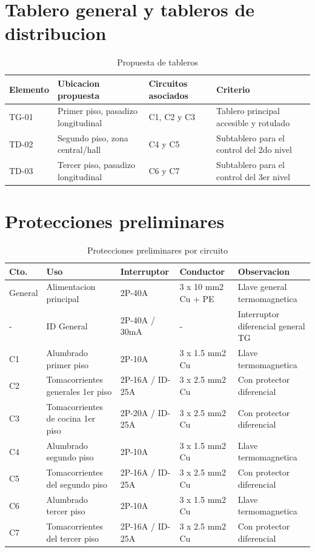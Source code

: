 \section{Tablero general y tableros de distribucion}

\begin{table}[H]
\centering
\small
\caption{Propuesta de tableros}
\label{tab:tableros-distribucion}
\begin{tabularx}{\textwidth}{L{1.8cm}L{4.0cm}L{4.2cm}Y}
\toprule
\textbf{Elemento} & \textbf{Ubicacion propuesta} & \textbf{Circuitos asociados} & \textbf{Criterio} \\
\midrule
TG-01 & Primer piso, pasadizo longitudinal & C1, C2 y C3 & Tablero principal accesible y rotulado \\
TD-02 & Segundo piso, zona central/hall & C4 y C5 & Subtablero para el control del 2do nivel \\
TD-03 & Tercer piso, pasadizo longitudinal & C6 y C7 & Subtablero para el control del 3er nivel \\
\bottomrule
\end{tabularx}
\end{table}

\section{Protecciones preliminares}

\begin{table}[H]
\centering
\small
\setlength{\tabcolsep}{3pt}
\caption{Protecciones preliminares por circuito}
\label{tab:protecciones-preliminares}
\begin{tabularx}{\textwidth}{l Y Y Y Y}
\toprule
\textbf{Cto.} & \textbf{Uso} & \textbf{Interruptor} & \textbf{Conductor} & \textbf{Observacion} \\
\midrule
General & Alimentacion principal & 2P-40A & 3 x 10 mm2 Cu + PE & Llave general termomagnetica \\
- & ID General & 2P-40A / 30mA & - & Interruptor diferencial general TG \\
C1 & Alumbrado primer piso & 2P-10A & 3 x 1.5 mm2 Cu & Llave termomagnetica \\
C2 & Tomacorrientes generales 1er piso & 2P-16A / ID-25A & 3 x 2.5 mm2 Cu & Con protector diferencial \\
C3 & Tomacorrientes de cocina 1er piso & 2P-20A / ID-25A & 3 x 2.5 mm2 Cu & Con protector diferencial \\
C4 & Alumbrado segundo piso & 2P-10A & 3 x 1.5 mm2 Cu & Llave termomagnetica \\
C5 & Tomacorrientes del segundo piso & 2P-16A / ID-25A & 3 x 2.5 mm2 Cu & Con protector diferencial \\
C6 & Alumbrado tercer piso & 2P-10A & 3 x 1.5 mm2 Cu & Llave termomagnetica \\
C7 & Tomacorrientes del tercer piso & 2P-16A / ID-25A & 3 x 2.5 mm2 Cu & Con protector diferencial \\
\bottomrule
\end{tabularx}
\end{table}


